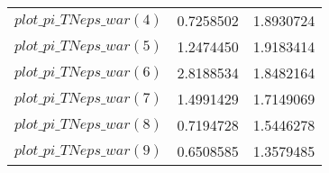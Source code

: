 \begin{center}
\begin{longtable}{lcc}
$plot\_pi\_TN eps\_war (4)   $	 & 	      0.7258502	 & 	      1.8930724 \\ 
$plot\_pi\_TN eps\_war (5)   $	 & 	      1.2474450	 & 	      1.9183414 \\ 
$plot\_pi\_TN eps\_war (6)   $	 & 	      2.8188534	 & 	      1.8482164 \\ 
$plot\_pi\_TN eps\_war (7)   $	 & 	      1.4991429	 & 	      1.7149069 \\ 
$plot\_pi\_TN eps\_war (8)   $	 & 	      0.7194728	 & 	      1.5446278 \\ 
$plot\_pi\_TN eps\_war (9)   $	 & 	      0.6508585	 & 	      1.3579485 \\ 
\end{longtable}
 \end{center}
